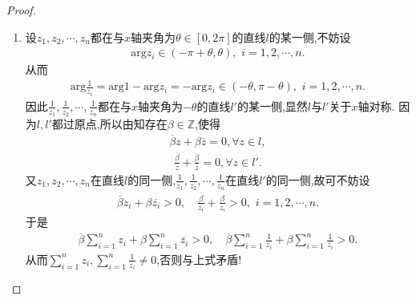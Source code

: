 \documentclass[../../main.tex]{subfiles}%
\begin{document}
\begin{proof}
\begin{enumerate}[(1)]
\item 设$z_1,z_2,\cdots ,z_n$都在与$x$轴夹角为$\theta \in \left[ 0,2\pi \right]$的直线$l$的某一侧,不妨设
\begin{align*}
\mathrm{arg}z_i\in \left( -\pi +\theta ,\theta \right),\,\,i=1,2,\cdots ,n.
\end{align*}
从而
\begin{align*}
\mathrm{arg}\frac{1}{z_i}=\mathrm{arg}1-\mathrm{arg}z_i=-\mathrm{arg}z_i\in \left( -\theta ,\pi -\theta \right),\,\,i=1,2,\cdots ,n.
\end{align*}
因此$\frac{1}{z_1},\frac{1}{z_2},\cdots ,\frac{1}{z_n}$都在与$x$轴夹角为$-\theta$的直线$l'$的某一侧,显然$l$与$l'$关于$x$轴对称.
因为$l,l'$都过原点,所以由知存在$\beta \in \mathbb{Z}$,使得
\begin{align*}
\overline{\beta }z+\beta \overline{z}=0,\forall z\in l,
\end{align*}
\begin{align*}
\frac{\overline{\beta }}{z}+\frac{\beta}{\overline{z}}=0,\forall z\in l'.
\end{align*}
又$z_1,z_2,\cdots ,z_n$在直线$l$的同一侧,$\frac{1}{z_1},\frac{1}{z_2},\cdots ,\frac{1}{z_n}$在直线$l'$的同一侧,故可不妨设
\begin{align*}
\overline{\beta }z_i+\beta \overline{z_i}>0,\quad \frac{\overline{\beta }}{z_i}+\frac{\beta}{\overline{z_i}}>0,\,\,i=1,2,\cdots ,n.
\end{align*}
于是
\begin{align*}
\overline{\beta }\sum\limits_{i=1}^n{z_i}+\beta \sum\limits_{i=1}^n{\overline{z_i}}>0,\quad \overline{\beta }\sum\limits_{i=1}^n{\frac{1}{z_i}}+\beta \sum\limits_{i=1}^n{\frac{1}{\overline{z_i}}}>0.
\end{align*}
从而$\sum\limits_{i=1}^n{z_i},\sum\limits_{i=1}^n{\frac{1}{z_i}}\ne 0$,否则与上式矛盾!


\end{enumerate}
\end{proof}
\end{document}
